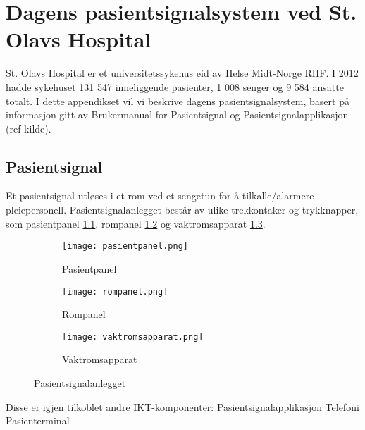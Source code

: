 \chapter{Dagens pasientsignalsystem ved St. Olavs Hospital}
\label{appendix_dagenssystem}

St. Olavs Hospital er et universitetssykehus eid av Helse Midt-Norge RHF. I 2012 hadde sykehuset 131 547 inneliggende pasienter, 1 008 senger og 9 584 ansatte totalt. 
I dette appendikset vil vi beskrive dagens pasientsignalsystem, basert på informasjon gitt av Brukermanual for Pasientsignal og Pasientsignalapplikasjon (ref kilde).

\section{Pasientsignal}
Et pasientsignal utløses i et rom ved et sengetun for å tilkalle/alarmere pleiepersonell. Pasientsignalanlegget består av ulike trekkontaker og trykknapper, som pasientpanel \ref{pasientpanel}, rompanel \ref{rompanel} og vaktromsapparat \ref{vaktromsapparat}.

\begin{figure}
        \centering
        \begin{subfigure}[b]{0.3\textwidth}
                \texttt{[image: pasientpanel.png]}
                \caption{Pasientpanel}
                \label{pasientpanel}
        \end{subfigure}%
        \begin{subfigure}[b]{0.3\textwidth}
                \texttt{[image: rompanel.png]}
                \caption{Rompanel}
                \label{rompanel}
        \end{subfigure}
        \begin{subfigure}[b]{0.3\textwidth}
                \texttt{[image: vaktromsapparat.png]}
                \caption{Vaktromsapparat}
                \label{vaktromsapparat}
        \end{subfigure}
        \caption{Pasientsignalanlegget}\label{pasientsignalanlegget}
\end{figure}

Disse er igjen tilkoblet andre IKT-komponenter:
Pasientsignalapplikasjon
Telefoni
Pasienterminal